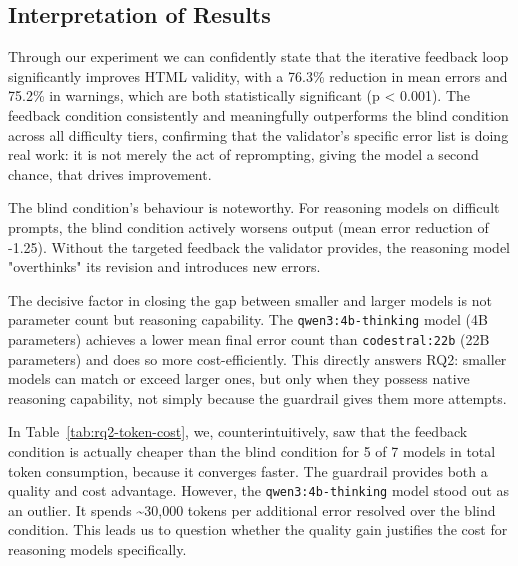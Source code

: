 \subsection{Interpretation of Results}


Through our experiment we can confidently state that the iterative feedback loop significantly improves HTML validity, with a 76.3\% reduction in mean errors and 75.2\% in warnings, which are both statistically significant (p < 0.001). The feedback condition consistently and meaningfully outperforms the blind condition across all difficulty tiers, confirming that the validator's specific error list is doing real work: it is not merely the act of reprompting, giving the model a second chance, that drives improvement.


The blind condition's behaviour is noteworthy. For reasoning models on difficult prompts, the blind condition actively worsens output (mean error reduction of -1.25). Without the targeted feedback the validator provides, the reasoning model "overthinks" its revision and introduces new errors.


The decisive factor in closing the gap between smaller and larger models is not parameter count but reasoning capability. The \verb|qwen3:4b-thinking| model (4B parameters) achieves a lower mean final error count than \verb|codestral:22b| (22B parameters) and does so more cost-efficiently. This directly answers RQ2: smaller models can match or exceed larger ones, but only when they possess native reasoning capability, not simply because the guardrail gives them more attempts.


In Table~\ref{tab:rq2-token-cost}, we, counterintuitively, saw that the feedback condition is actually cheaper than the blind condition for 5 of 7 models in total token consumption, because it converges faster. The guardrail provides both a quality and cost advantage. However, the \verb|qwen3:4b-thinking| model stood out as an outlier. It spends \textasciitilde30,000 tokens per additional error resolved over the blind condition. This leads us to question whether the quality gain justifies the cost for reasoning models specifically.

